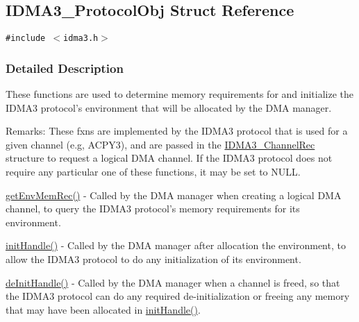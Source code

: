 \hypertarget{struct_i_d_m_a3___protocol_obj}{
\subsection{IDMA3\_\-Protocol\-Obj Struct Reference}
\label{struct_i_d_m_a3___protocol_obj}
}
{\tt \#include $<$idma3.h$>$}



\subsubsection{Detailed Description}
These functions are used to determine memory requirements for and initialize the IDMA3 protocol's environment that will be allocated by the DMA manager. 

\begin{Desc}
\item[Remarks:]These fxns are implemented by the IDMA3 protocol that is used for a given channel (e.g, ACPY3), and are passed in the \hyperlink{struct_i_d_m_a3___channel_rec}{IDMA3\_\-Channel\-Rec} structure to request a logical DMA channel. If the IDMA3 protocol does not require any particular one of these functions, it may be set to NULL.

\hyperlink{struct_i_d_m_a3___protocol_obj_8985b385f24d611a7e65f1b6fc867159}{get\-Env\-Mem\-Rec()} - Called by the DMA manager when creating a logical DMA channel, to query the IDMA3 protocol's memory requirements for its environment.

\hyperlink{struct_i_d_m_a3___protocol_obj_147bfd9a69a93542195adcdea86a6a58}{init\-Handle()} - Called by the DMA manager after allocation the environment, to allow the IDMA3 protocol to do any initialization of its environment.

\hyperlink{struct_i_d_m_a3___protocol_obj_7ce1036a56ee66ca9d0a195c04e40518}{de\-Init\-Handle()} - Called by the DMA manager when a channel is freed, so that the IDMA3 protocol can do any required de-initialization or freeing any memory that may have been allocated in \hyperlink{struct_i_d_m_a3___protocol_obj_147bfd9a69a93542195adcdea86a6a58}{init\-Handle()}. \end{Desc}




